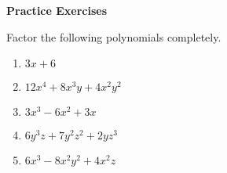 \textbf{Practice Exercises}

\vspce

Factor the following polynomials completely. 

\begin{enumerate}
\item \hspce $3x + 6$
\item \hspce $12x^{4} + 8x^{3}y + 4x^{2}y^{2}$
\item \hspce $3x^{3} - 6x^{2} + 3x$
\item \hspce $6y^{3}z + 7y^{2}z^{2} + 2yz^{3}$
\item \hspce $6 x^{3} - 8 x^{2} y^{2} + 4 x^{2} z$
\end{enumerate}